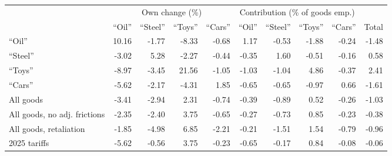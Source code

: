 \begin{tabular}{lrrrrrrrrr}
\toprule
 & \multicolumn{4}{c}{Own change (\%)} & \multicolumn{4}{c}{Contribution (\% of goods emp.)} & \\
\cmidrule(lr){2-5}\cmidrule(lr){6-9}
 & ``Oil'' & ``Steel'' & ``Toys'' & ``Cars'' & ``Oil'' & ``Steel'' & ``Toys'' & ``Cars'' & Total \\
\midrule
``Oil'' & 10.16 & -1.77 & -8.33 & -0.68 & 1.17 & -0.53 & -1.88 & -0.24 & -1.48 \\
``Steel'' & -3.02 & 5.28 & -2.27 & -0.44 & -0.35 & 1.60 & -0.51 & -0.16 & 0.58 \\
``Toys'' & -8.97 & -3.45 & 21.56 & -1.05 & -1.03 & -1.04 & 4.86 & -0.37 & 2.41 \\
``Cars'' & -5.62 & -2.17 & -4.31 & 1.85 & -0.65 & -0.65 & -0.97 & 0.66 & -1.61 \\
\midrule
All goods & -3.41 & -2.94 & 2.31 & -0.74 & -0.39 & -0.89 & 0.52 & -0.26 & -1.03 \\
All goods, no adj. frictions & -2.35 & -2.40 & 3.75 & -0.65 & -0.27 & -0.73 & 0.85 & -0.23 & -0.38 \\
All goods, retaliation & -1.85 & -4.98 & 6.85 & -2.21 & -0.21 & -1.51 & 1.54 & -0.79 & -0.96 \\
\midrule
2025 tariffs & -5.62 & -0.56 & 3.75 & -0.23 & -0.65 & -0.17 & 0.84 & -0.08 & -0.06 \\
\bottomrule
\end{tabular}
